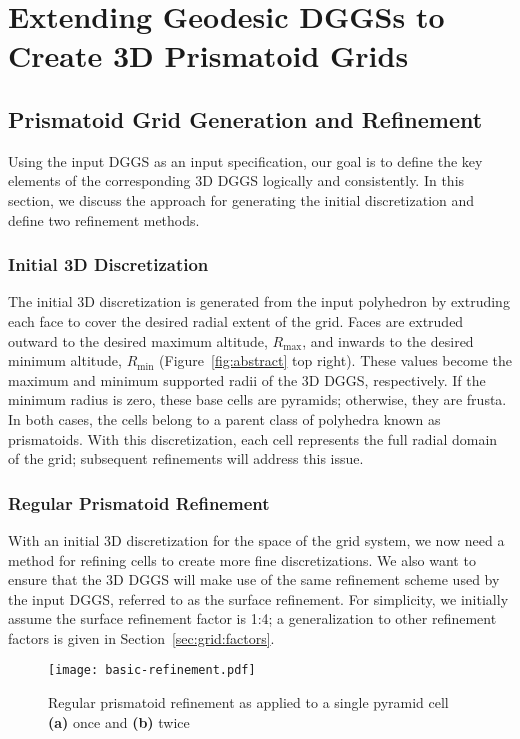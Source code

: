 \chapter{Extending Geodesic DGGSs to Create 3D Prismatoid Grids} \label{chap:extension}
\cite{sirdeshmukh2019utilizing}
\cite{xie2013interactive}


\section{Prismatoid Grid Generation and Refinement}
Using the input DGGS as an input specification, our goal is to define the key elements of the corresponding 3D DGGS logically and consistently.
In this section, we discuss the approach for generating the initial discretization and define two refinement methods.


\subsection{Initial 3D Discretization} \label{sec:grid:discretization}
The initial 3D discretization is generated from the input polyhedron by extruding each face to cover the desired radial extent of the grid.
Faces are extruded outward to the desired maximum altitude, $R_\mathrm{max}$, and inwards to the desired minimum altitude, $R_\mathrm{min}$ (Figure~\ref{fig:abstract} top right).
These values become the maximum and minimum supported radii of the 3D DGGS, respectively.
If the minimum radius is zero, these base cells are pyramids; otherwise, they are frusta.
In both cases, the cells belong to a parent class of polyhedra known as prismatoids.
With this discretization, each cell represents the full radial domain of the grid; subsequent refinements will address this issue.


\subsection{Regular Prismatoid Refinement} \label{sec:grid:regular}
With an initial 3D discretization for the space of the grid system, we now need a method for refining cells to create more fine discretizations.
We also want to ensure that the 3D DGGS will make use of the same refinement scheme used by the input DGGS, referred to as the surface refinement.
For simplicity, we initially assume the surface refinement factor is 1:4; a generalization to other refinement factors is given in Section~\ref{sec:grid:factors}.


\begin{figure}[h]
	\centering
	\texttt{[image: basic-refinement.pdf]}
	\caption{Regular prismatoid refinement as applied to a single pyramid cell \textbf{(a)} once and \textbf{(b)} twice}
	\label{fig:regular}
\end{figure}


